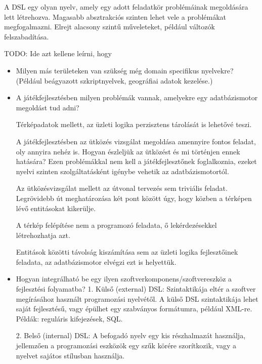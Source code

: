 
A DSL egy olyan nyelv, amely egy adott feladatkör problémáinak megoldására lett létrehozva. Magasabb absztrakciós szinten lehet vele a problémákat megfogalmazni.
Elrejt alacsony szintű műveleteket, például változók felszabadítása.

TODO: Ide azt kellene leírni, hogy
\begin{itemize}
\item Milyen más területeken van szükség még domain specifikus nyelvekre? (Például beágyazott szkriptnyelvek, geográfiai adatok kezelése.)


\item A játékfejlesztésben milyen problémák vannak, amelyekre egy adatbázismotor megoldást tud adni?

Térképadatok mellett, az üzleti logika perzisztens tárolását is lehetővé teszi.

A játékfejlesztésben az ütközés vizsgálat megoldása amennyire fontos feladat, oly annyira nehéz is. Hogyan észleljük az ütközést és mi történjen ennek hatására?
Ezen problémákkal nem kell a játékfejlesztőnek foglalkoznia, ezeket nyelvi szinten szolgáltatásként igénybe vehetik az adatbázismotortól.

Az ütközésvizsgálat mellett az útvonal tervezés sem triviális feladat. Legrövidebb út meghatározása két pont között úgy, hogy közben a térképen lévő entitásokat kikerülje.

A térkép felépítése nem a programozó feladata, ő lekérdezésekkel létrehozhatja azt.

Entitások közötti távolság kiszámítása sem az üzleti logika fejlesztőinek feladata, az adatbázismotor elvégzi ezt is helyettük.



\item Hogyan integrálható be egy ilyen szoftverkomponens/szoftvereszköz a fejlesztési folyamatba?
1. Külső (external) DSL: Szintaktikája eltér a szoftver megírásához használt programozási nyelvétől. A külső DSL szintaktikája lehet saját fejlesztésű, vagy épülhet egy szabványos formátumra, például XML-re.
Példák: reguláris kifejezések, SQL.

2. Belső (internal) DSL: A befogadó nyelv egy kis részhalmazát használja, jellemzően a programozási eszközök egy szűk körére szorítkozik, vagy a nyelvet sajátos stílusban használja.
\end{itemize}